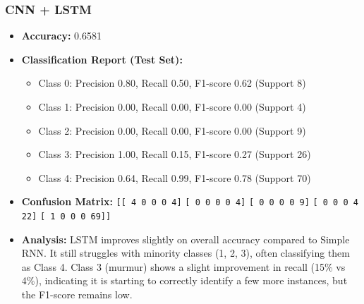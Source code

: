 \documentclass[a4paper]{article}
\begin{document}
\begin{multicols}{2}
\begin{itemize}
\end{itemize}

\subsubsection{CNN + LSTM}
\begin{itemize}
    \item \textbf{Accuracy:} 0.6581 
    \item \textbf{Classification Report (Test Set):} 
        \begin{itemize}
            \item Class 0: Precision 0.80, Recall 0.50, F1-score 0.62 (Support 8)
            \item Class 1: Precision 0.00, Recall 0.00, F1-score 0.00 (Support 4)
            \item Class 2: Precision 0.00, Recall 0.00, F1-score 0.00 (Support 9)
            \item Class 3: Precision 1.00, Recall 0.15, F1-score 0.27 (Support 26)
            \item Class 4: Precision 0.64, Recall 0.99, F1-score 0.78 (Support 70)
        \end{itemize}
    \item \textbf{Confusion Matrix:} 
        \texttt{[[ 4 0 0 0 4]}
        \texttt{[ 0 0 0 0 4]}
        \texttt{[ 0 0 0 0 9]}
        \texttt{[ 0 0 0 4 22]}
        \texttt{[ 1 0 0 0 69]]}
    \item \textbf{Analysis:} LSTM improves slightly on overall accuracy compared to Simple RNN. It still struggles with minority classes (1, 2, 3), often classifying them as Class 4. Class 3 (murmur) shows a slight improvement in recall (15\% vs 4\%), indicating it is starting to correctly identify a few more instances, but the F1-score remains low.

\end{itemize}


\end{multicols}
\end{document}
